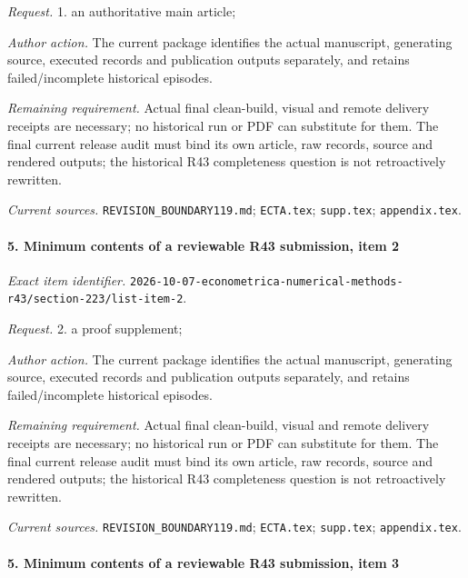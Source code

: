 \par\emph{Request.} 1. an authoritative main article;

\par\emph{Author action.} The current package identifies the actual manuscript, generating source, executed records and publication outputs separately, and retains failed/\allowbreak{}incomplete historical episodes.

\par\emph{Remaining requirement.} Actual final clean-build, visual and remote delivery receipts are necessary; no historical run or PDF can substitute for them. The final current release audit must bind its own article, raw records, source and rendered outputs; the historical R43 completeness question is not retroactively rewritten.

\par\emph{Current sources.} \nolinkurl{REVISION_BOUNDARY119.md}; \nolinkurl{ECTA.tex}; \nolinkurl{supp.tex}; \nolinkurl{appendix.tex}.

\paragraph{5. Minimum contents of a reviewable R43 submission, item 2}

\emph{Exact item identifier.} \nolinkurl{2026-10-07-econometrica-numerical-methods-r43/section-223/list-item-2}.

\par\emph{Request.} 2. a proof supplement;

\par\emph{Author action.} The current package identifies the actual manuscript, generating source, executed records and publication outputs separately, and retains failed/\allowbreak{}incomplete historical episodes.

\par\emph{Remaining requirement.} Actual final clean-build, visual and remote delivery receipts are necessary; no historical run or PDF can substitute for them. The final current release audit must bind its own article, raw records, source and rendered outputs; the historical R43 completeness question is not retroactively rewritten.

\par\emph{Current sources.} \nolinkurl{REVISION_BOUNDARY119.md}; \nolinkurl{ECTA.tex}; \nolinkurl{supp.tex}; \nolinkurl{appendix.tex}.

\paragraph{5. Minimum contents of a reviewable R43 submission, item 3}


